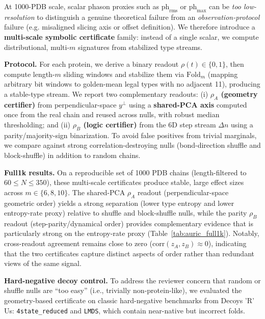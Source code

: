 At 1000-PDB scale, scalar phason proxies such as $\mathrm{ph}_{\mathrm{rms}}$ or $\mathrm{ph}_{\max}$ can be \emph{too low-resolution} to distinguish a genuine theoretical failure from an \emph{observation-protocol} failure (e.g. misaligned slicing axis or offset definition). We therefore introduce a \textbf{multi-scale symbolic certificate} family: instead of a single scalar, we compute distributional, multi-$m$ signatures from stabilized type streams.

\textbf{Protocol.} For each protein, we derive a binary readout $\rho(t)\in\{0,1\}$, then compute length-$m$ sliding windows and stabilize them via $\mathrm{Fold}_m$ (mapping arbitrary bit windows to golden-mean legal types with no adjacent 11), producing a stable-type stream. We report two complementary readouts:
(i) \textbf{$\rho_A$ (geometry certifier)} from perpendicular-space $y^\perp$ using a \textbf{shared-PCA axis} computed once from the real chain and reused across nulls, with robust median thresholding; and
(ii) \textbf{$\rho_B$ (logic certifier)} from the 6D step stream $\Delta n$ using a parity/majority-sign binarization. To avoid false positives from trivial marginals, we compare against strong correlation-destroying nulls (bond-direction shuffle and block-shuffle) in addition to random chains.

\textbf{Full1k results.} On a reproducible set of 1000 PDB chains (length-filtered to $60\le N\le 350$), these multi-scale certificates produce stable, large effect sizes across $m\in\{6,8,10\}$. The shared-PCA $\rho_A$ readout (perpendicular-space geometric order) yields a strong separation (lower type entropy and lower entropy-rate proxy) relative to shuffle and block-shuffle nulls, while the parity $\rho_B$ readout (step-parity/dynamical order) provides complementary evidence that is particularly strong on the entropy-rate proxy (Table~\ref{tab:auric_full1k}). Notably, cross-readout agreement remains close to zero ($\mathrm{corr}(z_A,z_B)\approx 0$), indicating that the two certificates capture distinct aspects of order rather than redundant views of the same signal.

\textbf{Hard-negative decoy control.} To address the reviewer concern that random or shuffle nulls are ``too easy'' (i.e., trivially non-protein-like), we evaluated the geometry-based certificate on classic hard-negative benchmarks from Decoys 'R' Us: \texttt{4state\_reduced} and \texttt{LMDS}, which contain near-native but incorrect folds.


